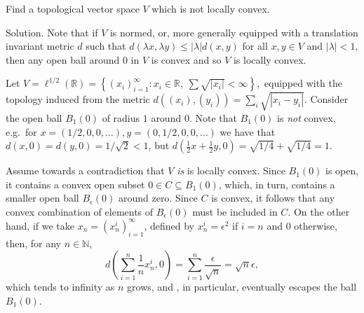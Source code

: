 \documentclass[12pt, reqno,a4paper, twoside]{amsproc}
\newcommand{\dbN}{\mathbb N}
\newcommand{\dbR}{\mathbb R}
\newcommand{\set}[1]{\left\{{#1}\right\}}
\newcommand{\abs}[1]{\left|#1\right|}
\newenvironment{sol}{\sc Solution. \rm}{\hfill \qedsymbol\bigskip}
\begin{document}
\begin{exer}
	Find a topological vector space $V$ which is not locally convex.
\end{exer}
\begin{sol}
	Note that if $V$ is normed, or, more generally equipped with a translation invariant metric $d$ such that $d(\lambda x,\lambda y)\le \abs{\lambda}d(x,y)$ for all $x,y\in V$ and $\abs{\lambda}<1$, then any open ball around $0$ in $V$ is convex and so $V$ is locally convex.
	
	Let $V=\ell^{1/2}(\dbR)=\set{(x_i)_{i=1}^\infty:x_i\in \dbR,\:\sum\sqrt{\abs{x_i}}<\infty}, $ equipped with the topology induced from the metric $d((x_i),(y_i))=\sum_i\sqrt{\abs{x_i-y_i}}$. Consider the open ball $B_1(0)$ of radius $1$ around $0$. Note that $B_1(0)$ is \textit{not} convex, e.g.\ for $x=(1/2,0,0,\ldots), y=(0,1/2,0,0,\ldots)$
	we have that $d(x,0)=d(y,0)=1/\sqrt{2}<1$, but $d(\frac{1}{2}x+\frac{1}{2}y,0)=\sqrt{1/4}+\sqrt{1/4}=1$. 
	
	Assume towards a contradiction that $V$\textit{ is} is locally convex. Since $B_1(0)$ is open, it contains a convex open subset $0\in C\subseteq B_1(0)$, which, in turn, contains a smaller open ball $B_\epsilon(0)$ around zero. Since $C$ is convex, it follows that any convex combination of elements of $B_\epsilon(0)$ must be included in $C$. On the other hand, if we take $x_n=(x_n^i)_{i=1}^\infty$, defined by $x_n^i=\epsilon^2$ if $i=n$ and $0$ otherwise, then, for any $n\in \dbN$,
	\[d(\sum_{i=1}^n\frac{1}{n}x_n^i,0)=\sum_{i=1}^n\frac{\epsilon}{\sqrt{n}}=\sqrt{n}\epsilon,\]
	which tends to infinity as $n$ grows, and , in particular, eventually escapes the ball $B_1(0)$.
\end{sol}
\end{document}

